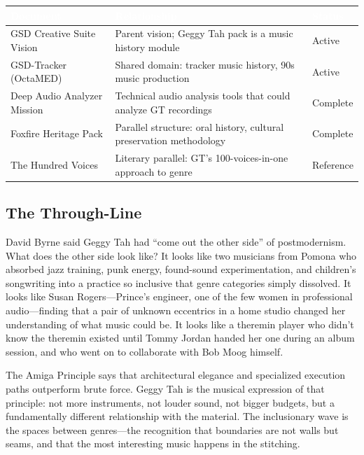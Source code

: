 \documentclass[11pt,letterpaper]{article}
\newcommand{\tableheader}[1]{\textbf{\sffamily\textcolor{white}{#1}}}
\begin{document}
\begin{center}
\begin{tabularx}{\textwidth}{L{4.5cm}XC{2cm}}
\toprule
{}
\tableheader{Document} & \tableheader{Relationship} & \tableheader{Status} \\
\midrule
GSD Creative Suite Vision & Parent vision; Geggy Tah pack is a music history module & Active \\
GSD-Tracker (OctaMED) & Shared domain: tracker music history, 90s music production & Active \\
Deep Audio Analyzer Mission & Technical audio analysis tools that could analyze GT recordings & Complete \\
Foxfire Heritage Pack & Parallel structure: oral history, cultural preservation methodology & Complete \\
The Hundred Voices & Literary parallel: GT's 100-voices-in-one approach to genre & Reference \\
\bottomrule
\end{tabularx}
\end{center}

\subsection{The Through-Line}

David Byrne said Geggy Tah had ``come out the other side'' of postmodernism. What does the other side look like? It looks like two musicians from Pomona who absorbed jazz training, punk energy, found-sound experimentation, and children's songwriting into a practice so inclusive that genre categories simply dissolved. It looks like Susan Rogers---Prince's engineer, one of the few women in professional audio---finding that a pair of unknown eccentrics in a home studio changed her understanding of what music could be. It looks like a theremin player who didn't know the theremin existed until Tommy Jordan handed her one during an album session, and who went on to collaborate with Bob Moog himself.

The Amiga Principle says that architectural elegance and specialized execution paths outperform brute force. Geggy Tah is the musical expression of that principle: not more instruments, not louder sound, not bigger budgets, but a fundamentally different relationship with the material. The inclusionary wave is the spaces between genres---the recognition that boundaries are not walls but seams, and that the most interesting music happens in the stitching.
\end{document}
